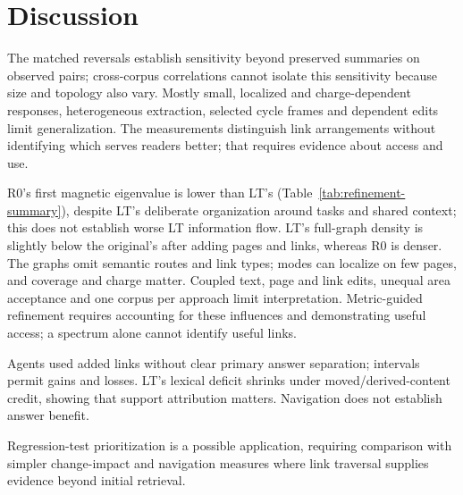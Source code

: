 \section{Discussion}
\label{sec:discussion}
The matched reversals establish sensitivity beyond preserved summaries on
observed pairs; cross-corpus correlations cannot isolate this sensitivity
because size and topology also vary. Mostly small, localized and charge-dependent
responses, heterogeneous extraction, selected cycle frames and dependent edits
limit generalization. The measurements distinguish link arrangements without
identifying which serves readers better; that requires evidence about access
and use.

R0's first magnetic eigenvalue is lower than LT's
(Table~\ref{tab:refinement-summary}), despite LT's deliberate organization
around tasks and shared context; this does not establish worse LT information
flow. LT's full-graph density is slightly below the original's after adding pages
and links, whereas R0 is denser. The graphs omit semantic routes and link types;
modes can localize on few pages, and coverage and charge matter. Coupled text,
page and link edits, unequal area acceptance and one corpus per approach limit
interpretation. Metric-guided refinement requires accounting for these influences
and demonstrating useful access; a spectrum alone cannot identify useful links.

Agents used added links without clear primary answer separation; intervals
permit gains and losses. LT's lexical deficit shrinks under moved/derived-content
credit, showing that support attribution matters. Navigation does not establish
answer benefit.

Regression-test prioritization is a possible application, requiring comparison
with simpler change-impact and navigation measures where link traversal
supplies evidence beyond initial retrieval.
